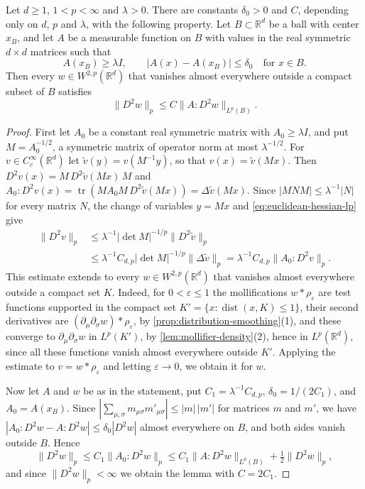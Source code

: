 \begin{lemma}\label{lem:frozen-coefficient-lp}
Let $d\geq1$, $1<p<\infty$ and $\lambda>0$. There are constants $\delta_0>0$ and $C$, depending only on $d$, $p$ and $\lambda$, with the following property. Let $B\subset\mathbb R^d$ be a ball with center $x_B$, and let $A$ be a measurable function on $B$ with values in the real symmetric $d\times d$ matrices such that
\[
 A(x_B)\geq\lambda I,\qquad |A(x)-A(x_B)|\leq\delta_0\quad\text{for }x\in B.
\]
Then every $w\in W^{2,p}(\mathbb R^d)$ that vanishes almost everywhere outside a compact subset of $B$ satisfies
\[
 \|D^2w\|_p\leq C\|A:D^2w\|_{L^p(B)}.
\]
\end{lemma}
\begin{proof}
First let $A_0$ be a constant real symmetric matrix with $A_0\geq\lambda I$, and put $M=A_0^{-1/2}$, a symmetric matrix of operator norm at most $\lambda^{-1/2}$. For $v\in C_c^\infty(\mathbb R^d)$ let $\tilde v(y)=v(M^{-1}y)$, so that $v(x)=\tilde v(Mx)$. Then $D^2v(x)=M\,D^2\tilde v(Mx)\,M$ and $A_0:D^2v(x)=\operatorname{tr}(MA_0M\,D^2\tilde v(Mx))=\Delta\tilde v(Mx)$. Since $|MNM|\leq\lambda^{-1}|N|$ for every matrix $N$, the change of variables $y=Mx$ and \eqref{eq:euclidean-hessian-lp} give
\[
 \begin{aligned}
 \|D^2v\|_p&\leq\lambda^{-1}|\det M|^{-1/p}\|D^2\tilde v\|_p\\
 &\leq\lambda^{-1}C_{d,p}|\det M|^{-1/p}\|\Delta\tilde v\|_p
 =\lambda^{-1}C_{d,p}\|A_0:D^2v\|_p.
 \end{aligned}
\]
This estimate extends to every $w\in W^{2,p}(\mathbb R^d)$ that vanishes almost everywhere outside a compact set $K$. Indeed, for $0<\varepsilon\leq1$ the mollifications $w*\rho_\varepsilon$ are test functions supported in the compact set $K'=\{x:\operatorname{dist}(x,K)\leq1\}$, their second derivatives are $(\partial_\mu\partial_\sigma w)*\rho_\varepsilon$, by \cref{prop:distribution-smoothing}(1), and these converge to $\partial_\mu\partial_\sigma w$ in $L^p(K')$, by \cref{lem:mollifier-density}(2), hence in $L^p(\mathbb R^d)$, since all these functions vanish almost everywhere outside $K'$. Applying the estimate to $v=w*\rho_\varepsilon$ and letting $\varepsilon\to0$, we obtain it for $w$.

Now let $A$ and $w$ be as in the statement, put $C_1=\lambda^{-1}C_{d,p}$, $\delta_0=1/(2C_1)$, and $A_0=A(x_B)$. Since $|\sum_{\mu,\sigma}m_{\mu\sigma}m'_{\mu\sigma}|\leq|m|\,|m'|$ for matrices $m$ and $m'$, we have $|A_0:D^2w-A:D^2w|\leq\delta_0|D^2w|$ almost everywhere on $B$, and both sides vanish outside $B$. Hence
\[
 \|D^2w\|_p\leq C_1\|A_0:D^2w\|_p\leq C_1\|A:D^2w\|_{L^p(B)}+\tfrac12\|D^2w\|_p,
\]
and since $\|D^2w\|_p<\infty$ we obtain the lemma with $C=2C_1$.
\end{proof}

